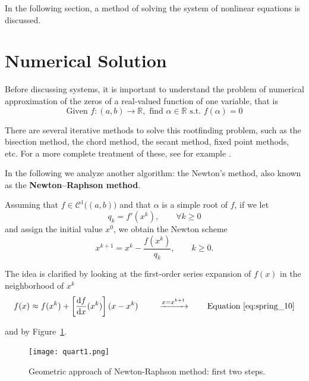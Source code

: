 In the following section, a method of solving the system of nonlinear equations is discussed.

\section{Numerical Solution}
\label{sec:numerical_solution1}%

Before discussing systems, it is important to understand the problem of numerical approximation of the zeros of a real-valued function of one variable, that is
\begin{equation}
\label{eq:spring_8}
\boxed{\text{Given }f:(a,b)\to\mathbb{R},\text{ find }\alpha\in\mathbb{R}\text{ s.t. }f(\alpha)=0}
\end{equation}

There are several iterative methods to solve this rootfinding problem, such as the bisection method, the chord method, the secant method, fixed point methods, etc. For a more complete treatment of these, see for example \cite{quarter}.

In the following we analyze another algorithm: the Newton's method, also known as the \textbf{Newton–Raphson method}.

Assuming that $f\in\mathcal{C}^1\big( (a,b) \big)$ and that $\alpha$ is a simple root of $f$, if we let
\begin{equation}
\label{eq:spring_9}
q_k=f' ( x^k ),\qquad\forall k\geq 0
\end{equation}
and assign the initial value $x^0$, we obtain the Newton scheme
\begin{equation}
\label{eq:spring_10}
x^{k+1}=x^k-\frac{f( x^k )}{q_k},\qquad k\geq 0.
\end{equation}

The idea is clarified by looking at the first-order series expansion of $f(x)$ in the neighborhood of $x^k$
\begin{equation}
\label{eq:spring_11}
f(x)\approx f ( x^k )+\left[\frac{\text{d}f}{\text{d}x}(x^k)\right](x-x^k) \qquad\ \xrightarrow[]{x=x^{k+1}} \qquad \text{Equation~\eqref{eq:spring_10}}
\end{equation}

and by Figure~\ref{fig:quart1}.

\begin{figure}[H]
    \centering
    \texttt{[image: quart1.png]}
    \caption{Geometric approach of Newton-Raphson method: first two steps.}
    \label{fig:quart1}
\end{figure}

